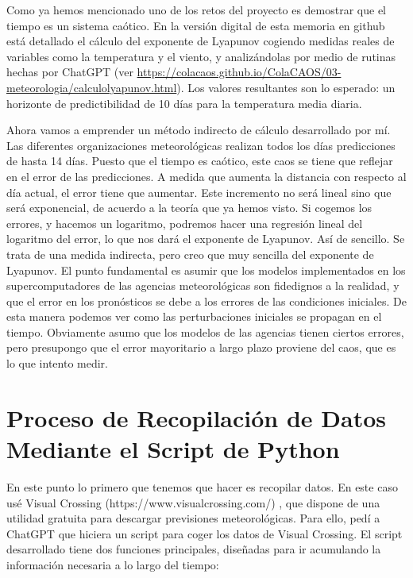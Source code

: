 \documentclass[
  10pt,
  a4paper,
  DIV=11,
  numbers=noendperiod,
  open=any]{scrreprt}
\numberwithin{equation}{chapter}
\numberwithin{equation}{section}
\renewcommand{\[}{\begin{equation}}
\renewcommand{\]}{\end{equation}}
\begin{document}
Como ya hemos mencionado uno de los retos del proyecto es demostrar que
el tiempo es un sistema caótico. En la versión digital de esta memoria en github está detallado el cálculo del exponente de Lyapunov cogiendo medidas reales de
variables como la temperatura y el viento, y analizándolas por medio de
rutinas hechas por ChatGPT (ver \url{https://colacaos.github.io/ColaCAOS/03-meteorologia/calculolyapunov.html}). Los valores resultantes son lo esperado: un
horizonte de predictibilidad de 10 días para la temperatura media
diaria.

Ahora vamos a emprender un método indirecto de cálculo desarrollado por mí. Las diferentes
organizaciones meteorológicas realizan todos los días predicciones de
hasta 14 días. Puesto que el tiempo es caótico, este caos se tiene que
reflejar en el error de las predicciones. A medida que aumenta la
distancia con respecto al día actual, el error tiene que aumentar. Este
incremento no será lineal sino que será exponencial, de acuerdo a la
teoría que ya hemos visto. Si cogemos los errores, y hacemos un
logaritmo, podremos hacer una regresión lineal del logaritmo del error,
lo que nos dará el exponente de Lyapunov. Así de sencillo. Se trata de
una medida indirecta, pero creo que muy sencilla del exponente de
Lyapunov. El punto fundamental es asumir que los modelos implementados en los supercomputadores de las agencias meteorológicas son fidedignos a la realidad, y que el error en los pronósticos se debe a los errores de las condiciones iniciales. De esta manera podemos ver como las perturbaciones iniciales se propagan en el tiempo. Obviamente asumo que los modelos de las agencias tienen ciertos errores, pero presupongo que el error mayoritario a largo plazo proviene del caos, que es lo que intento medir. 

\section{Proceso de Recopilación de Datos Mediante el Script de
Python}\label{proceso-de-recopilaciuxf3n-de-datos-mediante-el-script-de-python}

En este punto lo primero que tenemos que hacer es recopilar datos. En
este caso usé Visual Crossing
(https://www.visualcrossing.com/) , que dispone de una utilidad
gratuita para descargar previsiones meteorológicas. Para ello, pedí a
ChatGPT que hiciera un script para coger los datos de Visual Crossing.
El script desarrollado tiene dos funciones principales, diseñadas para
ir acumulando la información necesaria a lo largo del tiempo:
\end{document}
